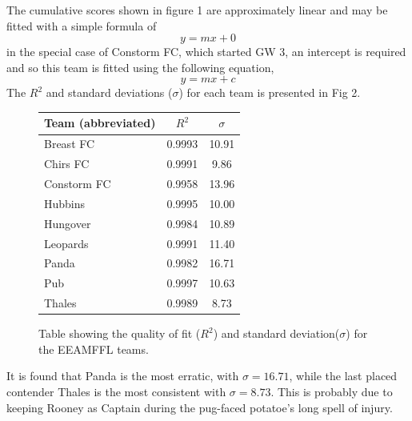 \documentclass[aps,prl,twocolumn,showpacs,superscriptaddress,groupedaddress]{revtex4}  %
\begin{document}
The cumulative scores shown in figure 1 are approximately linear and may be fitted with a simple formula of
\begin{equation}
y=mx+0
\end{equation}
in the special case of Constorm FC, which started GW 3, an intercept is required and so this team is fitted using the following equation,
\begin{equation}
y=mx+c
\end{equation}
The $R^2$ and standard deviations ($\sigma$) for each team is presented in Fig 2.
\begin{figure}
\begin{tabular}{l c c }

Team (abbreviated) & $R^2$ & $\sigma$ \\ 
\hline \hline 
Breast FC & 0.9993 & 10.91 \\ 
\hline 
Chirs FC & 0.9991 & 9.86 \\ 
\hline 
Constorm FC & 0.9958 & 13.96 \\ 
\hline 
Hubbins & 0.9995 & 10.00 \\ 
\hline 
Hungover & 0.9984 & 10.89 \\ 
\hline 
Leopards & 0.9991 & 11.40 \\ 
\hline 
Panda & 0.9982 & 16.71 \\ 
\hline 
Pub & 0.9997 & 10.63 \\ 
\hline 
Thales & 0.9989 & 8.73 \\ 
\hline 
\end{tabular} 
\caption{Table showing the quality of fit ($R^2$) and standard deviation($\sigma$) for the EEAMFFL teams.}
\end{figure}
It is found that Panda is the most erratic, with $\sigma = 16.71$, while the last placed contender Thales is the most consistent with $\sigma = 8.73$. This is probably due to keeping Rooney as Captain during the pug-faced potatoe's long spell of injury.
\end{document}
